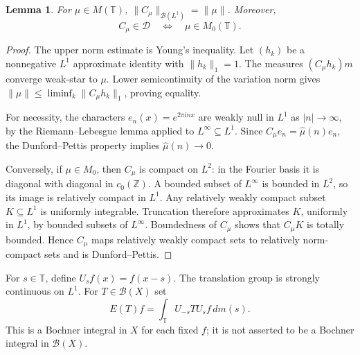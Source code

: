 \documentclass[11pt,reqno]{amsart}
\newtheorem{lemma}[theorem]{Lemma}
\theoremstyle{definition}
\theoremstyle{remark}
\newcommand{\T}{\mathbb T}
\newcommand{\Z}{\mathbb Z}
\newcommand{\B}{\mathcal B}
\newcommand{\D}{\mathcal D}
\begin{document}
\begin{lemma}\label{lem:convolution}
For $\mu\in M(\T)$, $\|C_\mu\|_{\B(L^1)}=\|\mu\|$. Moreover,
\[
 C_\mu\in\D\quad\Longleftrightarrow\quad\mu\in M_0(\T).
\]
\end{lemma}
\begin{proof}
The upper norm estimate is Young's inequality. Let $(h_k)$ be a nonnegative $L^1$ approximate identity with $\|h_k\|_1=1$. The measures $(C_\mu h_k)m$ converge weak-star to $\mu$. Lower semicontinuity of the variation norm gives $\|\mu\|\leq\liminf_k\|C_\mu h_k\|_1$, proving equality.

For necessity, the characters $e_n(x)=e^{2\pi inx}$ are weakly null in $L^1$ as $|n|\to\infty$, by the Riemann--Lebesgue lemma applied to $L^\infty\subseteq L^1$. Since $C_\mu e_n=\widehat\mu(n)e_n$, the Dunford--Pettis property implies $\widehat\mu(n)\to0$.

Conversely, if $\mu\in M_0$, then $C_\mu$ is compact on $L^2$: in the Fourier basis it is diagonal with diagonal in $c_0(\Z)$. A bounded subset of $L^\infty$ is bounded in $L^2$, so its image is relatively compact in $L^1$. Any relatively weakly compact subset $K\subseteq L^1$ is uniformly integrable. Truncation therefore approximates $K$, uniformly in $L^1$, by bounded subsets of $L^\infty$. Boundedness of $C_\mu$ shows that $C_\mu K$ is totally bounded. Hence $C_\mu$ maps relatively weakly compact sets to relatively norm-compact sets and is Dunford--Pettis.
\end{proof}

For $s\in\T$, define $U_sf(x)=f(x-s)$. The translation group is strongly continuous on $L^1$. For $T\in\B(X)$ set
\begin{equation}\label{eq:average}
 E(T)f=\int_\T U_{-s}TU_sf\,dm(s).
\end{equation}
This is a Bochner integral in $X$ for each fixed $f$; it is not asserted to be a Bochner integral in $\B(X)$.
\end{document}
